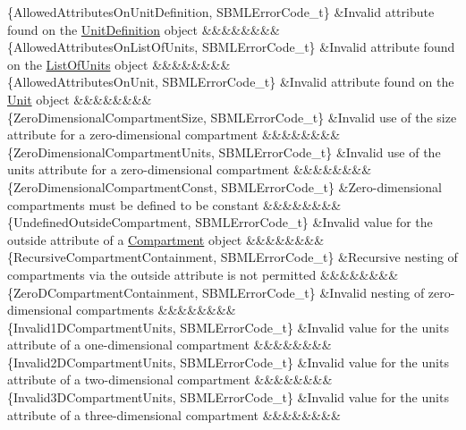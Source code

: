 \begin{DoxyParagraph}{}
\begin{longtabu}
\{Allowed\+Attributes\+On\+Unit\+Definition, S\+B\+M\+L\+Error\+Code\+\_\+t\} &Invalid attribute found on the \hyperlink{class_unit_definition}{Unit\+Definition} object &&&&&&&&\\
\{Allowed\+Attributes\+On\+List\+Of\+Units, S\+B\+M\+L\+Error\+Code\+\_\+t\} &Invalid attribute found on the \hyperlink{class_list_of_units}{List\+Of\+Units} object &&&&&&&&\\
\{Allowed\+Attributes\+On\+Unit, S\+B\+M\+L\+Error\+Code\+\_\+t\} &Invalid attribute found on the \hyperlink{class_unit}{Unit} object &&&&&&&&\\
\{Zero\+Dimensional\+Compartment\+Size, S\+B\+M\+L\+Error\+Code\+\_\+t\} &Invalid use of the \textquotesingle{}size\textquotesingle{} attribute for a zero-\/dimensional compartment &&&&&&&&\\
\{Zero\+Dimensional\+Compartment\+Units, S\+B\+M\+L\+Error\+Code\+\_\+t\} &Invalid use of the \textquotesingle{}units\textquotesingle{} attribute for a zero-\/dimensional compartment &&&&&&&&\\
\{Zero\+Dimensional\+Compartment\+Const, S\+B\+M\+L\+Error\+Code\+\_\+t\} &Zero-\/dimensional compartments must be defined to be constant &&&&&&&&\\
\{Undefined\+Outside\+Compartment, S\+B\+M\+L\+Error\+Code\+\_\+t\} &Invalid value for the \textquotesingle{}outside\textquotesingle{} attribute of a \hyperlink{class_compartment}{Compartment} object &&&&&&&&\\
\{Recursive\+Compartment\+Containment, S\+B\+M\+L\+Error\+Code\+\_\+t\} &Recursive nesting of compartments via the \textquotesingle{}outside\textquotesingle{} attribute is not permitted &&&&&&&&\\
\{Zero\+D\+Compartment\+Containment, S\+B\+M\+L\+Error\+Code\+\_\+t\} &Invalid nesting of zero-\/dimensional compartments &&&&&&&&\\
\{Invalid1\+D\+Compartment\+Units, S\+B\+M\+L\+Error\+Code\+\_\+t\} &Invalid value for the \textquotesingle{}units\textquotesingle{} attribute of a one-\/dimensional compartment &&&&&&&&\\
\{Invalid2\+D\+Compartment\+Units, S\+B\+M\+L\+Error\+Code\+\_\+t\} &Invalid value for the \textquotesingle{}units\textquotesingle{} attribute of a two-\/dimensional compartment &&&&&&&&\\
\{Invalid3\+D\+Compartment\+Units, S\+B\+M\+L\+Error\+Code\+\_\+t\} &Invalid value for the \textquotesingle{}units\textquotesingle{} attribute of a three-\/dimensional compartment &&&&&&&&\\

\end{longtabu}
\end{DoxyParagraph}
